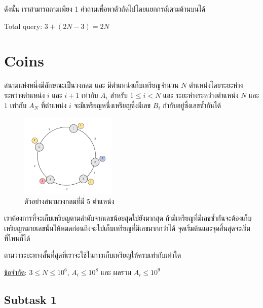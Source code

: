 \documentclass[12pt]{article}
\begin{document}
ดังนั้น เราสามารถถามเพียง 1 คำถามเพื่อหาตัวถัดไปโดยแยกกรณีตามด้านบนได้

Total query: $3 + (2N - 3) = 2N$

\newpage





























\section{Coins}

สนามแห่งหนึ่งมีลักษณะเป็นวงกลม และ มีตำแหน่งเก็บเหรียญจำนวน $N$ ตำแหน่งโดยระยะห่างระหว่างตำแหน่ง $i$ และ $i+1$ เท่ากับ $A_i$ สำหรับ $1 \leq i < N$ และ ระยะห่างระหว่างตำแหน่ง $N$ และ $1$ เท่ากับ $A_N$ ที่ตำแหน่ง $i$ จะมีเหรียญหนึ่งเหรียญซึ่งมีเลข $B_i$ กำกับอยู่ซึ่งเลขซ้ำกันได้

\begin{figure}[h]
  \centering
  \includegraphics[height=4cm]{./images/coins1.png}  
  \captionsetup{labelformat=empty}
  \caption{ตัวอย่างสนามวงกลมที่มี 5 ตำแหน่ง}
\end{figure}

เราต้องการที่จะเก็บเหรียญตามลำดับจากเลขน้อยสุดไปยังมากสุด ถ้ามีเหรียญที่มีเลขซ้ำกันจะต้องเก็บเหรียญหมายเลขนั้นให้หมดก่อนถึงจะไปเก็บเหรียญที่มีเลขมากกว่าได้ จุดเริ่มต้นและจุดสิ้นสุดจะเริ่มที่ไหนก็ได้

ถามว่าระยะทางสั้นที่สุดที่เราจะใช้ในการเก็บเหรียญให้ครบเท่ากับเท่าใด

\underline{ข้อจำกัด}: $3 \leq N \leq 10^6$, $A_i \leq 10^8$ และ ผลรวม $A_i \leq 10^9$

\subsection{Subtask 1}
\end{document}
